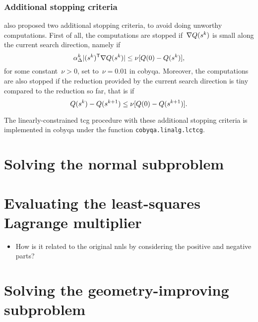 \subsubsection{Additional stopping criteria}

 also proposed two additional stopping criteria, to avoid doing unworthy computations.
First of all, the computations are stopped if~$\nabla Q(\sstep[k])$ is small along the current search direction, namely if
\begin{equation*}
    \alpha_{\rad}^k \abs{(\sstep[k])^{\T} \nabla Q(\sstep[k])} \le \nu [Q(0) - Q(\sstep[k])],
\end{equation*}
for some constant~$\nu > 0$, set to~$\nu = 0.01$ in \gls{cobyqa}.
Moreover, the computations are also stopped if the reduction provided by the current search direction is tiny compared to the reduction so far, that is if
\begin{equation*}
    Q(\sstep[k]) - Q(\sstep[k + 1]) \le \nu [Q(0) - Q(\sstep[k + 1])].
\end{equation*}

The linearly-constrained \gls{tcg} procedure with these additional stopping criteria is implemented in \gls{cobyqa} under the function \texttt{cobyqa.linalg.lctcg}.

\section{Solving the normal subproblem}
\label{sec:cobyqa-normal}

\section{Evaluating the least-squares Lagrange multiplier}
\label{sec:cobyqa-lagrange-multipliers}

\begin{itemize}
    \item How is it related to the original \gls{nnls} by considering the positive and negative parts?
\end{itemize}

\section{Solving the geometry-improving subproblem}
\label{sec:cobyqa-geometry-improving}
